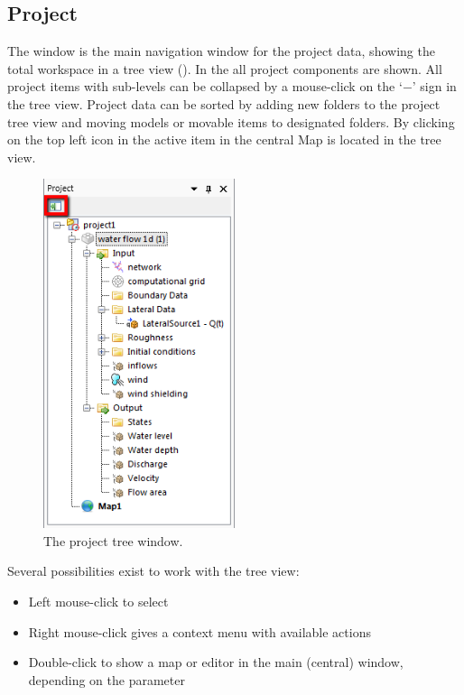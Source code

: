 \subsection{Project}
\label{subsec:project}
The  window is the main navigation window for the project data, showing the total workspace in a tree view (). In the  all project components are shown. 
%
All project items with sub-levels can be collapsed by a mouse-click on the `$-$' sign in the tree view. Project data can be sorted by adding new folders to the project tree view and moving models or movable items to designated folders.
%
By clicking on the top left icon in  the active item in the central Map is located in the tree view.
%
\begin{figure} [H]
	\centering
		\includegraphics[width=0.5\textwidth]{figures/chapter_overview/view_project_window.png}
	\caption{The project tree window.}
	\label{fig:fig2.2}
\end{figure}
%
Several possibilities exist to work with the tree view:
%
\begin{itemize}
	\item Left mouse-click to select
	\item Right mouse-click gives a context menu with available actions
	\item Double-click to show a map or editor in the main (central) window, depending on the parameter
\end{itemize}
%
